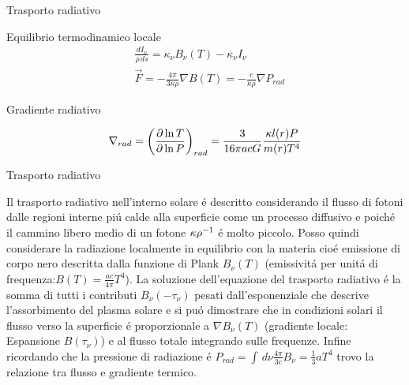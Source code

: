 \documentclass[10pt,xcolor={usenames},fleqn,mathserif,serif]{beamer}
\begin{document}
\begin{frame}{Trasporto radiativo}

\begin{block}{Equilibrio termodinamico locale}
\begin{align*}
&\frac{dI_{\nu}}{\rho\,ds}=\kappa_{\nu}B_{\nu}(T)-\kappa_{\nu}I_{\nu}\\
&\vec{F}=-\frac{4\pi}{3\kappa\rho}\nabla B(T)=-\frac{c}{\kappa\rho}\nabla P_{rad}
\end{align*}
\end{block}

\begin{block}{Gradiente radiativo}

\begin{equation*}
\nrad{}=\Dcvar{\PDly{P}{T}}{rad}=\frac{3}{16\pi acG}\frac{\kappa l(r)P}{m(r)T^4}%
\end{equation*}

\end{block}

\end{frame}

\begin{wordonframe}{Trasporto radiativo}

Il trasporto radiativo nell'interno solare \'e descritto considerando il flusso di fotoni  dalle regioni interne pi\'u calde alla superficie come un processo diffusivo e poich\'e il cammino libero medio di un fotone ${\kappa\rho}^{-1}$ \'e molto piccolo. Posso quindi considerare la radiazione localmente in equilibrio con la materia cio\'e emissione di corpo nero descritta dalla funzione di Plank $B_{\nu}(T)$ (emissivit\'a per unit\'a di frequenza:$B(T)=\frac{ac}{4\pi}T^4$). La soluzione dell'equazione del trasporto radiativo \'e la somma di tutti i contributi $B_{\nu}(-\tau_{\nu})$ pesati dall'esponenziale che descrive l'assorbimento del plasma solare e si pu\'o dimostrare che in condizioni solari il flusso verso la superficie \'e proporzionale a $\nabla B_{\nu}(T)$ (gradiente locale: Espansione $B(\tau_{\nu})$) e al flusso totale integrando sulle frequenze. Infine ricordando che la pressione di radiazione \'e $P_{rad}=\int\,d\nu\frac{4\pi}{3c}B_{\nu}=\frac{1}{3}aT^4$ trovo la relazione tra flusso e gradiente termico.

\end{wordonframe}
\end{document}
